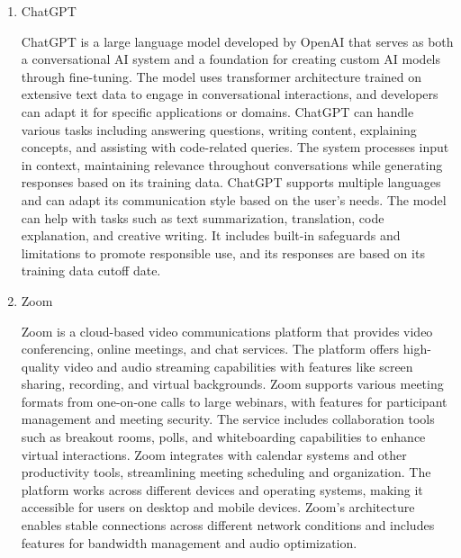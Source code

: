 \documentclass[conference]{IEEEtran}
\begin{document}
\begin{enumerate}[label=\arabic*]
    \vspace{1em}

    \item ChatGPT\par
    \vspace{0.3em}
    ChatGPT is a large language model developed by OpenAI that serves as both a conversational AI system and a foundation for creating custom AI models through fine-tuning. The model uses transformer architecture trained on extensive text data to engage in conversational interactions, and developers can adapt it for specific applications or domains. ChatGPT can handle various tasks including answering questions, writing content, explaining concepts, and assisting with code-related queries. The system processes input in context, maintaining relevance throughout conversations while generating responses based on its training data. ChatGPT supports multiple languages and can adapt its communication style based on the user's needs. The model can help with tasks such as text summarization, translation, code explanation, and creative writing. It includes built-in safeguards and limitations to promote responsible use, and its responses are based on its training data cutoff date.

    \vspace{1em}

    \item Zoom\par
    \vspace{0.3em}
    Zoom is a cloud-based video communications platform that provides video conferencing, online meetings, and chat services. The platform offers high-quality video and audio streaming capabilities with features like screen sharing, recording, and virtual backgrounds. Zoom supports various meeting formats from one-on-one calls to large webinars, with features for participant management and meeting security. The service includes collaboration tools such as breakout rooms, polls, and whiteboarding capabilities to enhance virtual interactions. Zoom integrates with calendar systems and other productivity tools, streamlining meeting scheduling and organization. The platform works across different devices and operating systems, making it accessible for users on desktop and mobile devices. Zoom's architecture enables stable connections across different network conditions and includes features for bandwidth management and audio optimization.
\end{enumerate}
\end{document}

